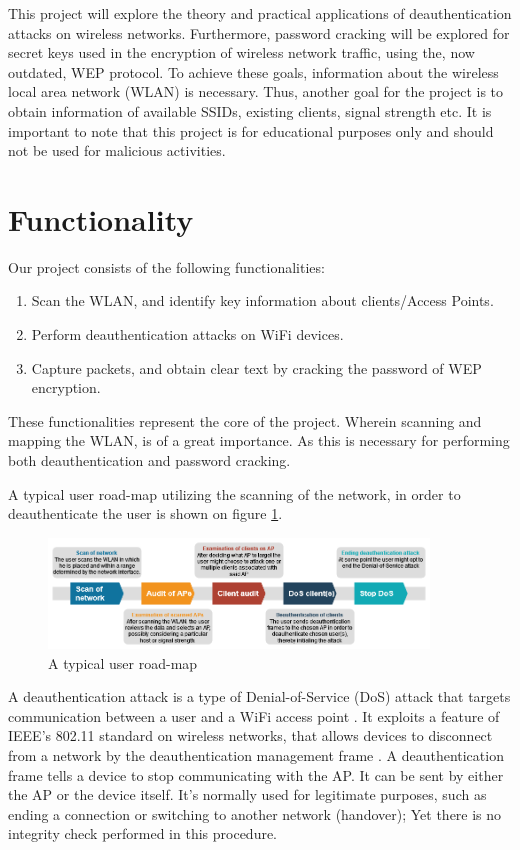 This project will explore the theory and practical applications of deauthentication attacks on wireless networks. Furthermore, password cracking will be explored for secret keys used in the encryption of wireless network traffic, using the, now outdated, WEP protocol. To achieve these goals, information about the wireless local area network (WLAN) is necessary. Thus, another goal for the project is to obtain information of available SSIDs, existing clients, signal strength etc.
It is important to note that this project is for educational purposes only and should not be used for malicious activities.


\section{Functionality}
Our project consists of the following functionalities:
\begin{enumerate}
    \item Scan the WLAN, and identify key information about clients/Access Points.
    \item Perform deauthentication attacks on WiFi devices.
    \item Capture packets, and obtain clear text by cracking the password of WEP encryption.
\end{enumerate}

These functionalities represent the core of the project. Wherein scanning and mapping the WLAN, is of a great importance. As this is necessary for performing both deauthentication and password cracking. 

A typical user road-map utilizing the scanning of the network, in order to deauthenticate the user is shown on figure \ref{user-roadmap}.  

\begin{figure}[!htbp]
    \centering
    \includegraphics[width=0.9\textwidth]{Latex-Files/Billeder/Flowcharts/user-roadmap.png}
    \caption{A typical user road-map}
    \label{user-roadmap}
\end{figure}

A deauthentication attack is a type of Denial-of-Service (DoS) attack that targets communication between a user and a WiFi access point \cite{Deauth}. It exploits a feature of IEEE's 802.11 standard on wireless networks, that allows devices to disconnect from a network by the deauthentication management frame \cite{Deauth_Wiki}.
A deauthentication frame tells a device to stop communicating with the AP. It can be sent by either the AP or the device itself. It's normally used for legitimate purposes, such as ending a connection or switching to another network (handover); Yet there is no integrity check performed in this procedure. 


